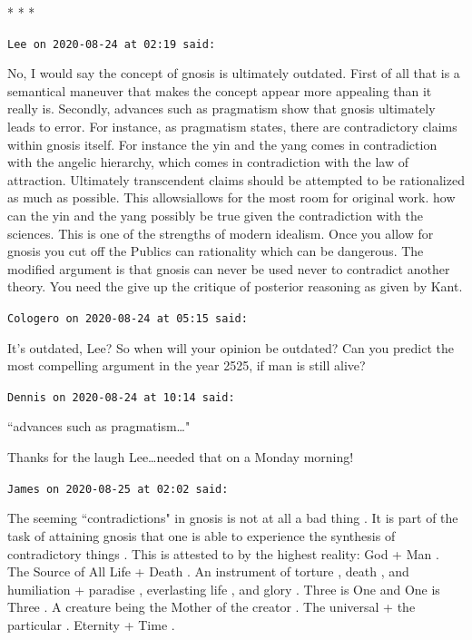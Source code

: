 
\begin{center}* * *\end{center}

\begin{footnotesize}\begin{sffamily}



\texttt{Lee on 2020-08-24 at 02:19 said: }

No, I would say the concept of gnosis is ultimately outdated. First of all that is a semantical maneuver that makes the concept appear more appealing than it really is. Secondly, advances such as pragmatism show that gnosis ultimately leads to error. For instance, as pragmatism states, there are contradictory claims within gnosis itself. For instance the yin and the yang comes in contradiction with the angelic hierarchy, which comes in contradiction with the law of attraction. Ultimately transcendent claims should be attempted to be rationalized as much as possible. This allowsiallows for the most room for original work. how can the yin and the yang possibly be true given the contradiction with the sciences. This is one of the strengths of modern idealism. Once you allow for gnosis you cut off the Publics can rationality which can be dangerous. The modified argument is that gnosis can never be used never to contradict another theory. You need the give up the critique of posterior reasoning as given by Kant.


\hfill

\texttt{Cologero on 2020-08-24 at 05:15 said: }

It's outdated, Lee? So when will your opinion be outdated? Can you predict the most compelling argument in the year 2525, if man is still alive?


\hfill

\texttt{Dennis on 2020-08-24 at 10:14 said: }

``advances such as pragmatism…"

Thanks for the laugh Lee…needed that on a Monday morning!


\hfill

\texttt{James on 2020-08-25 at 02:02 said: }

The seeming ``contradictions" in gnosis is not at all a bad thing . It is part of the task of attaining gnosis that one is able to experience the synthesis of contradictory things . This is attested to by the highest reality: God + Man . The Source of All Life + Death . An instrument of torture , death , and humiliation + paradise , everlasting life , and glory . Three is One and One is Three . A creature being the Mother of the creator . The universal + the particular . Eternity + Time .


\end{sffamily}
\end{footnotesize}

